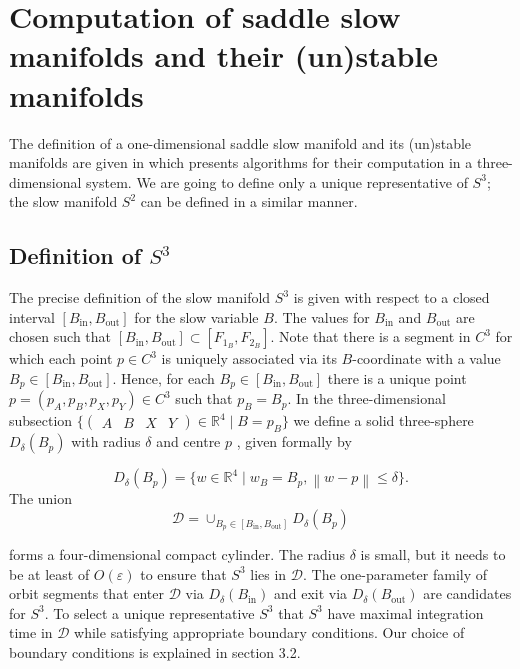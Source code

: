 \documentclass{ws-ijbc}
\begin{document}
 \section{Computation of saddle slow manifolds and their (un)stable manifolds}
    
The definition of a one-dimensional saddle slow manifold and its (un)stable manifolds are given in \cite{Saeed_Paper} which presents algorithms for their computation in a three-dimensional system.  We are going to define only a unique representative of $S^3$; the slow manifold $S^2$ can be defined in a similar manner.

\subsection{Definition of $S^3$}    
The precise definition of the slow manifold $S^3$ is given with respect to a closed interval $[B_{\mathrm{in}},B_{\mathrm{out}}]$ for the slow variable $B$.  The values for $B_{\mathrm{in}}$ and $B_{\mathrm{out}}$ are chosen such that $[B_{\mathrm{in}},B_{\mathrm{out}}] \subset [F_{1_B}, F_{2_B}]$.  Note that there is a segment in $C^3$ for which each point $p \in C^3$ is uniquely associated via its $B$-coordinate with a value $B_p \in [B_{\mathrm{in}},B_{\mathrm{out}}]$.  Hence, for each $B_p \in [B_{\mathrm{in}},B_{\mathrm{out}}]$ there is a unique point $p=(p_A,p_B,p_X,p_Y) \in C^3$ such that $p_B = B_p$.  In the three-dimensional subsection $\{ \begin{pmatrix} A & B & X & Y \end{pmatrix} \in \mathbb{R}^4 \; | \; B=p_B\}$ we define a solid three-sphere $D_\delta(B_p)$ with radius $\delta$ and centre $p$ , given formally by

\begin{equation*}
D_\delta(B_p)=\{w \in \mathbb{R}^4 \; | \; w_B = B_p, \left\lVert w-p \right\rVert \leq \delta\}.
\end{equation*}    
\noindent
The union 
\begin{equation*}
\mathscr{D} = \cup_{B_p \in [B_{\mathrm{in}}, B_{\mathrm{out}}]} D_\delta(B_p) 
\end{equation*}


\noindent
forms a four-dimensional compact cylinder.  The radius $\delta$ is small, but it needs to be at least of $O(\varepsilon)$ to ensure that $S^3$ lies in $\mathscr{D}$.  The one-parameter family of orbit segments that enter $\mathscr{D}$ via $D_\delta(B_{\mathrm{in}})$ and exit via $D_\delta(B_{\mathrm{out}})$ are candidates for $S^3$.   To select a unique representative $S^3$ that $S^3$ have maximal integration time in $\mathscr{D}$ while satisfying appropriate boundary conditions.  Our choice of boundary conditions is explained in section 3.2.
    
\end{document}
